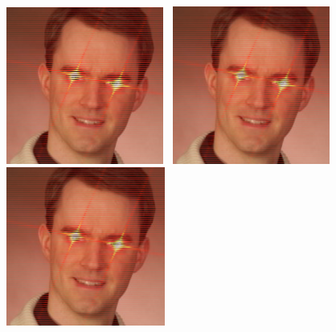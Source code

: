 \documentclass{article}
\begin{document}
%
%
%
%



\includegraphics[height=2.03in]{bastian_interlaced.png}~
\includegraphics[height=2.04in]{bastian_interlaced.png}~
\includegraphics[height=2.05in]{bastian_interlaced.png}

\vspace{1em}
\end{document}
